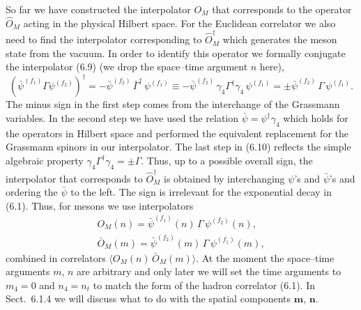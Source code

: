 So far we have constructed the interpolator $O_M$ that corresponds to the
operator $\hat{O}_M$ acting in the physical Hilbert space. For the Euclidean
correlator we also need to find the interpolator corresponding to
$\hat{O}_M^\dagger$ which generates the meson state from the vacuum. In order
to identify this operator we formally conjugate the interpolator (6.9) (we drop
the space--time argument $n$ here),
\begin{equation}
  \left( \bar\psi^{(f_1)} \Gamma \psi^{(f_2)} \right)^\dagger
  = -\bar\psi^{(f_2)}\, \bar{\Gamma}^\dagger\, \psi^{(f_1)}
  \equiv -\bar\psi^{(f_2)}\, \gamma_4 \Gamma^\dagger \gamma_4\, \psi^{(f_1)}
  = \pm \bar\psi^{(f_2)}\, \Gamma\, \psi^{(f_1)} .
\end{equation}
The minus sign in the first step comes from the interchange of the Grassmann
variables. In the second step we have used the relation $\bar\psi =
\psi^\dagger\gamma_4$ which holds for the operators in Hilbert space and
performed the equivalent replacement for the Grassmann spinors in our
interpolator. The last step in (6.10) reflects the simple algebraic property
$\gamma_4\Gamma^\dagger\gamma_4 = \pm\Gamma$. Thus, up to a possible overall
sign, the interpolator that corresponds to $\hat{O}_M^\dagger$ is obtained by
interchanging $\psi$'s and $\bar\psi$'s and ordering the $\bar\psi$ to the
left. The sign is irrelevant for the exponential decay in (6.1). Thus, for
mesons we use interpolators
\begin{equation}
  \begin{gathered}
    O_M(n) = \bar\psi^{(f_1)}(n)\, \Gamma\, \psi^{(f_2)}(n) , \\
    \bar{O}_M(m) = \bar\psi^{(f_2)}(m)\, \Gamma\, \psi^{(f_1)}(m) ,
  \end{gathered}
\end{equation}
combined in correlators $\big\langle O_M(n)\, \bar{O}_M(m)\big\rangle$. At the
moment the space--time arguments $m$, $n$ are arbitrary and only later we will
set the time arguments to $m_4 = 0$ and $n_4 = n_t$ to match the form of the
hadron correlator (6.1). In Sect.~6.1.4 we will discuss what to do with the
spatial components $\mathbf{m}$, $\mathbf{n}$.

